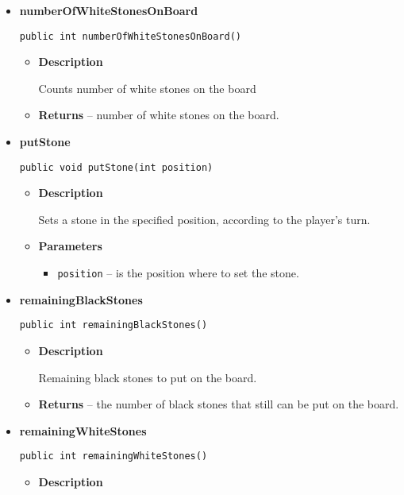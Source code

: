 \documentclass[11pt,a4paper]{report}
\begin{document}
{{{{{{{{{{{\begin{itemize}
{\begin{itemize}
{Computes the difference between the current state's number of stones and the adversary's.
}
\item{{\bf  Returns} -- 
the difference between the current state's number of stones and the adversary's. 
}%
\end{itemize}
}%
\item{ 
{\bf  numberOfWhiteStonesOnBoard}\\
\begin{lstlisting}[frame=none]
public int numberOfWhiteStonesOnBoard()\end{lstlisting} %
\begin{itemize}
\item{
{\bf  Description}

Counts number of white stones on the board
}
\item{{\bf  Returns} -- 
number of white stones on the board. 
}%
\end{itemize}
}%
\item{ 
{\bf  putStone}\\
\begin{lstlisting}[frame=none]
public void putStone(int position)\end{lstlisting} %
\begin{itemize}
\item{
{\bf  Description}

Sets a stone in the specified position, according to the player's turn.
}
\item{
{\bf  Parameters}
  \begin{itemize}
   \item{
\texttt{position} -- is the position where to set the stone.}
  \end{itemize}
}%
\end{itemize}
}%
\item{ 
{\bf  remainingBlackStones}\\
\begin{lstlisting}[frame=none]
public int remainingBlackStones()\end{lstlisting} %
\begin{itemize}
\item{
{\bf  Description}

Remaining black stones to put on the board.
}
\item{{\bf  Returns} -- 
the number of black stones that still can be put on the board. 
}%
\end{itemize}
}%
\item{ 
{\bf  remainingWhiteStones}\\
\begin{lstlisting}[frame=none]
public int remainingWhiteStones()\end{lstlisting} %
\begin{itemize}
\item{
{\bf  Description}

}
\end{itemize}}
\end{itemize}}}}}}}}}}}}
\end{document}
